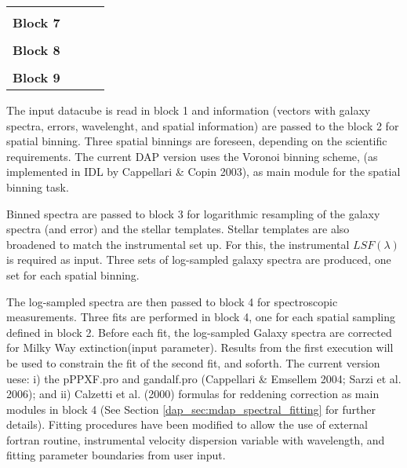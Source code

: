 \begin{table}
\begin{scriptsize}
\begin{tabular}{l |l |l | l}
\hline
              &                                 &  &  \\  
{\bf Block 7} &                                 &                                &  \\
\hline
              &                                 &  &  \\  
{\bf Block 8} &                                 &                                &  \\
\hline
              &                                 &  &  \\  
{\bf Block 9} &                                 &                                &  \\
\hline
\hline
\end{tabular}
\end{scriptsize}
\label{dap_tab:modules}
\end{table}

The input datacube is read in block 1 and information (vectors with
galaxy spectra, errors, wavelenght, and spatial information) are
passed to the block 2 for spatial binning. Three spatial binnings are
foreseen, depending on the scientific requirements. The current DAP
version uses the Voronoi binning scheme, (as implemented in IDL by
Cappellari \& Copin 2003), as main module for the spatial binning
task.

Binned spectra are passed to block 3 for logarithmic resampling of the
galaxy spectra (and error) and the stellar templates. Stellar
templates are also broadened to match the instrumental set up. For
this, the instrumental $LSF(\lambda)$ is required as input. Three sets
of log-sampled galaxy spectra are produced, one set for each spatial
binning.

The log-sampled spectra are then passed to block 4 for spectroscopic
measurements. Three fits are performed in block 4, one for each
spatial sampling defined in block 2. Before each fit, the log-sampled
Galaxy spectra are corrected for Milky Way extinction(input
parameter). Results from the first execution will be used to constrain
the fit of the second fit, and soforth. The current version uese: i)
the pPPXF.pro and gandalf.pro (Cappellari \& Emsellem 2004; Sarzi et
al. 2006); and ii) Calzetti et al. (2000) formulas for reddening
correction as main modules in block 4 (See Section
\ref{dap_sec:mdap_spectral_fitting} for further details). Fitting
procedures have been modified to allow the use of external fortran
routine, instrumental velocity dispersion variable with wavelength,
and fitting parameter boundaries from user input.

